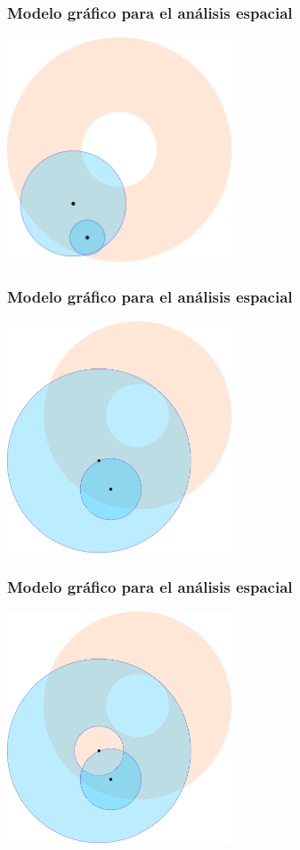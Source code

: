 \documentclass[handout]{beamer}
\theoremstyle{plain}
\theoremstyle{definition}
\theoremstyle{remark}
\begin{document}
\begin{frame}\frametitle{Modelo gráfico para el análisis espacial}
\centering
\includegraphics[width=0.5\textwidth]{path5815.png}
\end{frame}

\begin{frame}\frametitle{Modelo gráfico para el análisis espacial}
\centering
\includegraphics[width=0.5\textwidth]{path5816.png}
\end{frame}

\begin{frame}\frametitle{Modelo gráfico para el análisis espacial}
\centering
\includegraphics[width=0.5\textwidth]{path5817.png}
\end{frame}
\end{document}
